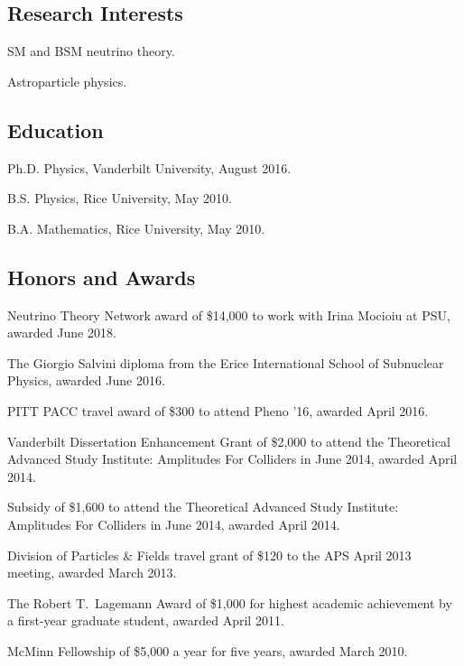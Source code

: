 \documentclass{article}
\renewenvironment{itemize}{
\begin{list}{}{
\setlength{\leftmargin}{.5em}}}{
\end{list}}
\begin{document}
\subsection*{Research Interests}
\begin{itemize}
\item SM and BSM neutrino theory.
\item Astroparticle physics.
\end{itemize}

\subsection*{Education}
\begin{itemize}
\item Ph.D. Physics, Vanderbilt University, August 2016.
\item B.S. Physics, Rice University, May 2010.
\item B.A. Mathematics, Rice University, May 2010.
\end{itemize}

\subsection*{Honors and Awards}
\begin{itemize}
\item Neutrino Theory Network award of \$14,000 to work with Irina Mocioiu at PSU, awarded June 2018.
\item The Giorgio Salvini diploma from the Erice International School of Subnuclear Physics, awarded June 2016.
\item PITT PACC travel award of \$300 to attend Pheno '16, awarded April 2016.
\item Vanderbilt Dissertation Enhancement Grant of \$2,000 to attend the Theoretical Advanced Study Institute: Amplitudes For Colliders
in June 2014, awarded April 2014.
\item Subsidy of \$1,600 to attend the Theoretical Advanced Study Institute: Amplitudes For Colliders in June 2014, awarded April 2014.
\item Division of Particles \& Fields travel grant of \$120 to the APS April 2013 meeting, awarded March 2013.
\item The Robert T.~Lagemann Award of \$1,000 for highest academic achievement by a first-year graduate student, awarded April 2011.
\item McMinn Fellowship of \$5,000 a year for five years, awarded March 2010.
\end{itemize}
\end{document}
